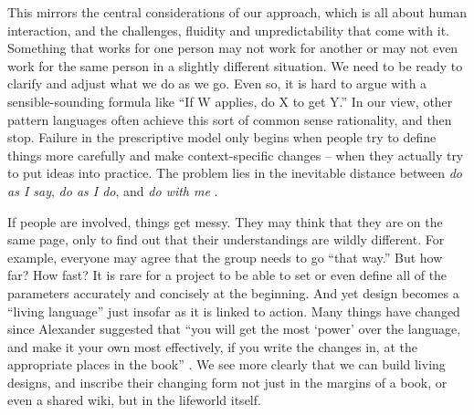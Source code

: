 
This mirrors the central considerations of our approach, which is all about human interaction, and the challenges, fluidity and unpredictability that come with it.  Something that works for one person may not work for another or may not even work for the same person in a slightly different situation.  We need to be ready to clarify and adjust what we do as we go.   Even so, it is hard to argue with a sensible-sounding formula like ``If W applies, do X to get Y.'' In our view, other pattern languages often achieve this sort of common sense rationality, and then stop.  Failure in the prescriptive model only begins when people try to define things more carefully and make context-specific changes -- when they actually try to put ideas into practice.  The problem lies in the inevitable distance between \emph{do as I say}, \emph{do as I do}, and \emph{do with me} \cite[p.~26]{deleuze1994difference}.

If people are involved, things get messy.   They may think that they are on the same page, only to find out that their understandings are wildly different.  For  example, everyone may agree that the group needs to go ``that way.''  But how far?  How fast?  It is rare for a project to be able to set or even define all of the parameters accurately and concisely at the beginning.
And yet design becomes a ``living language'' \cite[p.~xvii]{alexander1977pattern}  just insofar as it is linked to action.  Many things have changed since Alexander suggested that ``you will get the most `power' over the language, and make it your own most effectively, if you write the changes in, at the appropriate places in the book'' \cite[p.~xl]{alexander1977pattern}.  We see more clearly that we can build living designs, and inscribe their changing form not just in the margins of a book, or even a shared wiki, but in the lifeworld itself.  


